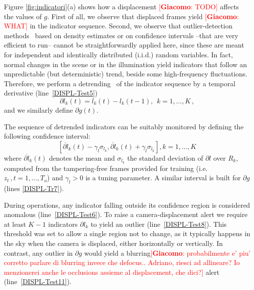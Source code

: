 \documentclass{llncs}
\newcommand{\gi}[1]{{\textcolor{red}{[\small \textbf{Giacomo}: #1]}}}
\begin{document}
Figure \ref{fig:indicatori}(a) shows how a displacement \gi{TODO} affects the values of $g$. First of all, we observe that displaced frames yield \gi{WHAT} in the indicator sequence. Second, we observe that outlier-detection methods~\cite{Chandola2009} based on density estimates or on confidence intervals --that are very efficient to run-- cannot be straightforwardly applied here, since these are meant for independent and identically distributed (i.i.d.) random variables. In fact, normal changes in the scene or in the illumination yield indicators that follow an unpredictable (but deterministic) trend, beside some high-frequency fluctuations. Therefore, we perform a detrending~\cite{Gustafsson2000} of the indicator sequence by a temporal derivative (line~\ref{DISPL-Test5})
\begin{equation}\label{eq:detrending}
 \partial l_k(t) = l_k(t)-l_k(t-1),  \ \ k = 1, \dots, K\,,
\end{equation}
and we similarly define $\partial g(t)$. 

The sequence of detrended indicators can be suitably monitored by defining the following confidence interval: 
\begin{equation}\label{eq:confidenceRegions}
 [\overline{\partial l}_k(t) - \gamma_l \sigma_{l_k}, \overline{\partial l}_k(t) + \gamma_l \sigma_{l_k}],  k = 1,\dots,K
\end{equation}
where $\overline{\partial l}_k(t)$ denotes the mean and $\sigma_{l_k}$ the standard deviation of $\partial l$ over $R_k$, computed from the tampering-free frames provided for training (i.e. $z_t\,, t = 1, \dots, T_o$) and $\gamma_l >0$ is a tuning parameter. A similar interval is built for $\partial g$ (lines \ref{DISPL-Tr7}). 

During operations, any indicator falling outside its confidence region is considered anomalous (line~\ref{DISPL-Test6}). To raise a camera-displacement alert we require at least $K-1$ indicators $\partial l_k$ to yield an outlier (line~\ref{DISPL-Test8}). This threshold was set to allow a single region not to change, as it typically happens in the sky when the camera is displaced, either horizontally or vertically. In contrast, any outlier in $\partial g$ would yield a blurring\gi{probabilmente e' piu' corretto parlare di blurring invece che defocus.. Adriano, riesci ad allineare? Io menzionerei anche le occlusions assieme al displacement, che dici?} alert (line~\ref{DISPL-Test11}).
\end{document}

